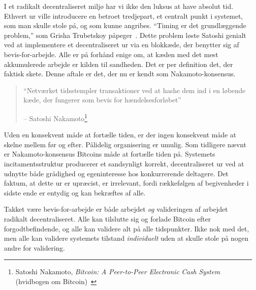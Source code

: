 \documentclass[paper=6in:9in,pagesize=pdftex,
               headinclude=on,footinclude=on,12pt]{scrbook}
\begin{document}
I et radikalt decentraliseret miljø har vi ikke den luksus at have absolut tid. Ethvert ur ville introducere en betroet tredjepart, et centralt punkt i systemet, som man skulle stole på, og som kunne angribes. \enquote{Timing er det grundlæggende problem,} som Grisha Trubetskoy påpeger~\cite{pow-clock}. Dette problem løste Satoshi genialt ved at implementere et decentraliseret ur via en blokkæde, der benytter sig af bevis-for-arbejde. Alle er på forhånd enige om, at kæden med det mest akkumulerede arbejde er kilden til sandheden. Det er per definition det, der faktisk skete. Denne aftale er det, der nu er kendt som Nakamoto-konsensus.\begin{quotation}\begin{samepage} \enquote{Netværket tidsstempler transaktioner ved at hashe dem ind i en løbende kæde, der fungerer som bevis for hændelsesforløbet} \begin{flushright} -- Satoshi Nakamoto\footnote{Satoshi Nakamoto, \textit{Bitcoin: A Peer-to-Peer Electronic Cash System} (hvidbogen om Bitcoin)~\cite{whitepaper}}
\end{flushright}\end{samepage}\end{quotation}

Uden en konsekvent måde at fortælle tiden, er der ingen konsekvent måde at skelne mellem før og efter. Pålidelig organisering er umulig. Som tidligere nævnt er Nakamoto-konsensus Bitcoins måde at fortælle tiden på. Systemets incitamentsstruktur producerer et sandsynligt korrekt, decentraliseret ur ved at udnytte både grådighed og egeninteresse hos konkurrerende deltagere. Det faktum, at dette ur er upræcist, er irrelevant, fordi rækkefølgen af begivenheder i sidste ende er entydig og kan bekræftes af alle.

Takket være bevis-for-arbejde er både arbejdet \textit{og} valideringen af arbejdet radikalt decentraliseret. Alle kan tilslutte sig og forlade Bitcoin efter forgodtbefindende, og alle kan validere alt på alle tidspunkter. Ikke nok med det, men alle kan validere systemets tilstand \textit{individuelt} uden at skulle stole på nogen andre for validering.
\end{document}
